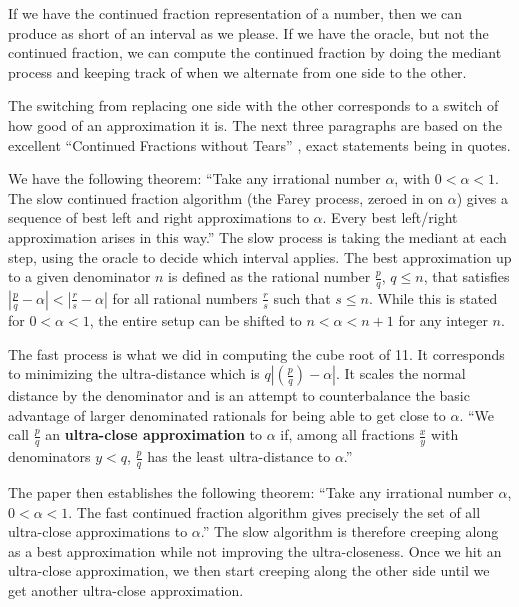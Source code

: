 \documentclass[12pt]{article}
\begin{document}
If we have the continued fraction representation of a number, then we can produce as short of an interval as we please. If we have the oracle, but not the continued fraction, we can compute the continued fraction by doing the mediant process and keeping track of when we alternate from one side to the other. 

The switching from replacing one side with the other corresponds to a switch of how good of an approximation it is. The next three paragraphs are based on the excellent ``Continued Fractions without Tears'' \cite{richards}, exact statements being in quotes.  

We have the following theorem: ``Take any irrational number $\alpha$, with $0 < \alpha < 1$. The slow continued fraction algorithm (the Farey process, zeroed in on $\alpha$) gives a sequence of best left and right approximations to $\alpha$. Every best left/right approximation arises in this way.'' The slow process is taking the mediant at each step, using the oracle to decide which interval applies. The best approximation up to a given denominator $n$ is defined as the rational number $\frac{p}{q}$, $q  \leq n$, that satisfies $|\frac{p}{q} - \alpha | < |\frac{r}{s} -\alpha|$ for all rational numbers $\frac{r}{s}$ such that $s \leq n$. While this is stated for $0 < \alpha < 1$, the entire setup can be shifted to $n < \alpha < n+1 $ for any integer $n$. 

The fast process is what we did in computing the cube root of 11. It corresponds to minimizing the ultra-distance which is $q|(\frac{p}{q})-\alpha|$. It scales the normal distance by the denominator and is an attempt to counterbalance the basic advantage of larger denominated rationals for being able to get close to $\alpha$.  ``We call $\frac{p}{q}$ an \textbf{ultra-close approximation} to $\alpha$ if, among all fractions $\frac{x}{y}$ with denominators $y < q$, $\frac{p}{q}$ has the least ultra-distance to $\alpha$.''

The paper then establishes the following theorem: ``Take any irrational number $\alpha$, $0 < \alpha < 1$. The fast continued fraction algorithm gives precisely the set of all ultra-close approximations to $\alpha$.''  The slow algorithm is therefore creeping along as a best approximation while not improving the ultra-closeness. Once we hit an ultra-close approximation, we then start creeping along the other side until we get another ultra-close approximation. 
\end{document}
